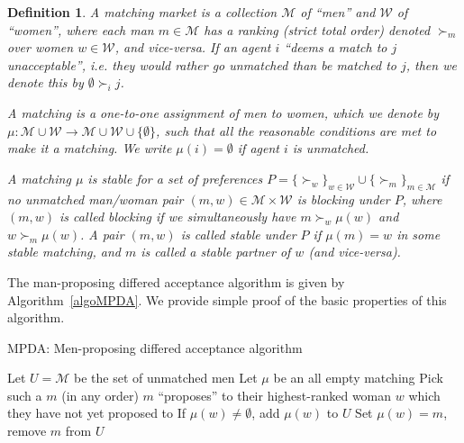 \documentclass[12pt]{article}
\newcommand{\M}{\mathcal{M}}
\newcommand{\W}{\mathcal{W}}
\newtheorem{definition}{Definition}[section]
\begin{document}
  \begin{definition}
    A matching market is a collection $\M$ of ``men'' and $\W$ of ``women'', where
    each man $m\in \M$ has a ranking (strict total order) denoted $\succ_m$ 
    over women $w\in \W$, and vice-versa.
    If an agent $i$ ``deems a match to $j$ unacceptable'', i.e. they would rather
    go unmatched than be matched to $j$, then we denote this by 
    $\emptyset \succ_i j$.

    A matching is a one-to-one assignment of men to women, which we denote
    by $\mu : \M\cup \W\to \M\cup \W\cup\{\emptyset\}$, such that all the reasonable
    conditions are met to make it a matching. We write $\mu(i) = \emptyset$ if
    agent $i$ is unmatched.

    A matching $\mu$ is \emph{stable} for a set of preferences 
    $P = \{\succ_w\}_{w\in\W} \cup \{\succ_m\}_{m\in\M}$
    if no unmatched man/woman pair 
    $(m,w)\in \M\times \W$ is blocking under $P$,
    where $(m,w)$ is called blocking if we simultaneously have
    $m \succ_w \mu(w)$ and $w \succ_m \mu(w)$.
    A \emph{pair} $(m,w)$ is called stable under $P$ if $\mu(m)=w$ in 
    \emph{some} stable matching,
    and $m$ is called a stable partner of $w$ (and vice-versa).

  \end{definition}

  The man-proposing differed acceptance algorithm is given by
  Algorithm~\ref{algoMPDA}. We provide simple proof of the basic properties of
  this algorithm.

  \begin{algorithm}
    \caption{MPDA: Men-proposing differed acceptance algorithm}
    \label{algoMPDA}
  \begin{algorithmic}[0]
    \State Let $U = \M$ be the set of unmatched men
    \State Let $\mu$ be an all empty matching
      \State Pick such a $m$ (in any order)
      \State $m$ ``proposes'' to their highest-ranked woman $w$ which 
        they have not yet proposed to
        \State If $\mu(w)\ne \emptyset$, add $\mu(w)$ to $U$
        \State Set $\mu(w) = m$, remove $m$ from $U$ 
      \EndIf
    \EndWhile
  \end{algorithmic}
  \end{algorithm}
\end{document}

